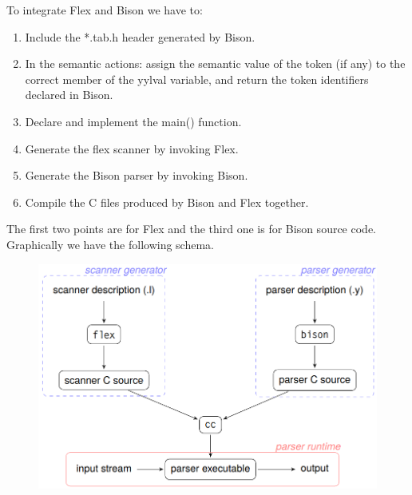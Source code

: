 To integrate Flex and Bison we have to: 
\begin{enumerate}
    \item Include the *.tab.h header generated by Bison. 
    \item In the semantic actions: assign the semantic value of the token (if any) to the correct member of the yylval variable, and return the token identifiers 
        declared in Bison. 
    \item Declare and implement the main() function. 
    \item Generate the flex scanner by invoking Flex. 
    \item Generate the Bison parser by invoking Bison. 
    \item Compile the C files produced by Bison and Flex together. 
\end{enumerate}
The first two points are for Flex and the third one is for Bison source code. Graphically we have the following schema. 
\begin{figure}[H]
    \centering
    \includegraphics[width=0.8\linewidth]{images/flbi.png}
\end{figure}